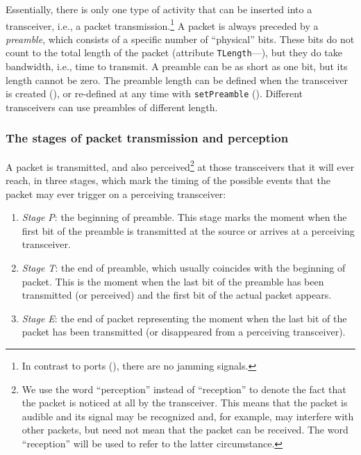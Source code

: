 Essentially, there is only one type of activity that can be inserted into
a transceiver, i.e., a packet transmission.\footnote{In contrast to ports
(), there are no jamming signals.}
A packet is always preceded by a {\em preamble}, which consists of a specific
number of ``physical'' bits.
These bits do not count to the total length of the packet (attribute
{\tt TLength}---), but they do take bandwidth, i.e.,
time to transmit.
A preamble can be as short as one bit, but its length cannot be zero.
The preamble length can be defined when the transceiver is created
(), or re-defined at any time with {\tt setPreamble}
().
Different transceivers can use preambles of different length.

\subsubsection{The stages of packet transmission and perception}
\label{rm_tr_ra_ps}

A packet is transmitted, and also perceived\footnote{We use the word
``perception'' instead of ``reception'' to denote the fact that the packet
is noticed at all by the transceiver.
This means that the packet is audible and its signal
may be recognized and, for example, may interfere with other packets,
but need not mean that the packet can be received.
The word ``reception'' will be used to refer to the latter circumstance.}
at those transceivers that it will
ever reach, in three stages, which mark the timing of the possible events
that the packet may ever trigger on a perceiving transceiver:
\begin{enumerate}
\item
{\em Stage P\/}: the beginning of preamble.
This stage marks the moment when the first bit of the
preamble is transmitted at the source or arrives at a perceiving
transceiver.
\item
{\em Stage T\/}:
the end of preamble, which usually coincides with the beginning of packet.
This is the moment when the last bit of the preamble has been transmitted (or
perceived) and the first bit of the actual packet appears.
\item
{\em Stage E\/}:
the end of packet representing the moment when the last bit of the
packet has been transmitted (or disappeared from a perceiving transceiver).
\end{enumerate}

